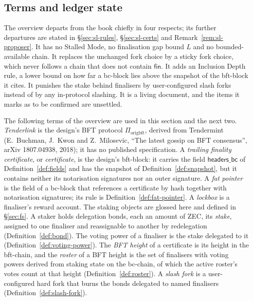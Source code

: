 \documentclass[11pt,a4paper]{article}
\theoremstyle{definition}
\newcommand{\Piorigbft}{\Pi_{\mathrm{origbft}}}
\newcommand{\headersbc}{\mathsf{headers\_bc}}
\newcommand{\fin}{\mathsf{fin}}
\begin{document}
\subsection{Terms and ledger state}\label{sec:sl-terms}

The overview departs from the book chiefly in four respects; its further
departures are stated in \S\ref{sec:sl-rules}, \S\ref{sec:sl-certs} and
Remark~\ref{rem:sl-proposer}. It has no Stalled Mode, no finalisation gap bound
$L$ and no bounded-available chain. It replaces the unchanged fork choice by a
sticky fork choice, which never follows a chain that does not contain $\fin$. It
adds an Inclusion Depth rule, a lower bound on how far a bc-block lies above the
snapshot of the bft-block it cites. It punishes the stake behind finalisers by
user-configured slash forks instead of by any in-protocol slashing. It is a
living document, and the items it marks as to be confirmed are unsettled.

The following terms of the overview are used in this section and the next
two. \emph{Tenderlink} is the design's BFT protocol $\Piorigbft$, derived
from Tendermint (E.~Buchman, J.~Kwon and Z.~Milosevic, ``The latest gossip
on BFT consensus'', arXiv 1807.04938, 2018); it has no published
specification. A \emph{trailing finality certificate}, or \emph{certificate}, is
the design's bft-block: it carries the field $\headersbc$ of
Definition~\ref{def:fields} and has the snapshot of
Definition~\ref{def:snapshot}, but it contains neither its notarisation
signatures nor an outer signature. A \emph{fat pointer} is the field of a
bc-block that references a certificate by hash together with notarisation
signatures; its rule is Definition~\ref{def:fat-pointer}. A \emph{lockbox}
is a finaliser's reward account. The staking objects are glossed here and
defined in \S\ref{sec:fs}. A staker holds delegation bonds, each an amount
of ZEC, its \emph{stake}, assigned to one finaliser and reassignable to
another by redelegation (Definition~\ref{def:bond}). The voting power of a
finaliser is the stake delegated to it (Definition~\ref{def:voting-power}). The
\emph{BFT height} of a certificate is its height in the bft-chain, and the
\emph{roster} of a BFT height is the set of finalisers with voting powers
derived from staking state on the bc-chain, of which the active roster's votes
count at that height (Definition~\ref{def:roster}). A \emph{slash fork} is
a user-configured hard fork that burns the bonds delegated to named
finalisers (Definition~\ref{def:slash-fork}).
\end{document}
